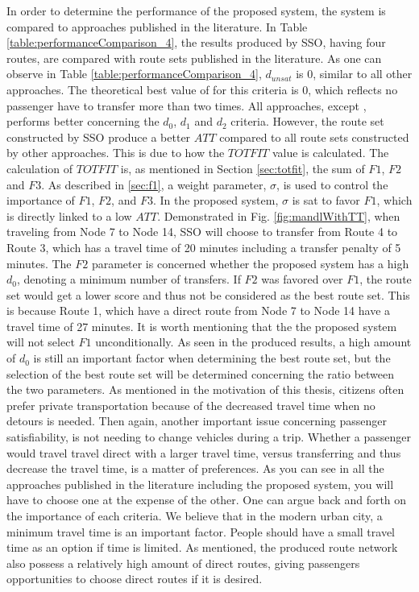 In order to determine the performance of the proposed system, the system is compared to approaches published in the literature. In Table \vref{table:performanceComparison_4}, the results produced by SSO, having four routes, are compared with route sets published in the literature. As one can observe in Table \vref{table:performanceComparison_4},  $d_{unsat}$ is 0, similar to all other approaches. The theoretical best value of for this criteria is 0, which reflects no passenger have to transfer more than two times. All approaches, except \citep{mandl79, kidwai98, chakroborty02}, performs better concerning the $d_0$, $d_1$ and $d_2$ criteria. However, the route set constructed by SSO produce a better $ATT$ compared to all route sets constructed by  other approaches. This is due to how the $TOTFIT$ value is calculated. The calculation of $TOTFIT$ is, as mentioned in Section \vref{sec:totfit}, the sum of $F1$, $F2$ and $F3$. As described in \vref{sec:f1}, a weight parameter, $\sigma$, is used to control the importance of $F1$, $F2$, and $F3$. In the proposed system, $\sigma$ is sat to favor $F1$, which is directly linked to a low $ATT$. Demonstrated in Fig. \vref{fig:mandlWithTT}, when traveling from Node 7 to Node 14, SSO will choose to transfer from Route 4 to Route 3, which has a travel time of 20 minutes including a transfer penalty of 5 minutes. The $F2$ parameter is concerned whether the proposed system has a high $d_0$, denoting a minimum number of transfers. If $F2$ was favored over $F1$, the route set would get a lower score and thus not be considered as the best route set. This is because Route 1, which have a direct route from Node 7 to Node 14 have a travel time of 27 minutes. It is worth mentioning that the the proposed system will not select $F1$ unconditionally. As seen in the produced results, a high amount of $d_0$ is still an important factor when determining the best route set, but the selection of the best route set will be determined concerning the ratio between the two parameters. As mentioned in the motivation of this thesis, citizens often prefer private transportation because of the decreased travel time when no detours is needed. Then again, another important issue concerning passenger satisfiability, is not needing to change vehicles during a trip. Whether a passenger would travel travel direct with a larger travel time, versus transferring and thus decrease the travel time, is a matter of preferences. As you can see in all the approaches published in the literature including the proposed system, you will have to choose one at the expense of the other. One can argue back and forth on the importance of each criteria. We believe that in the modern urban city, a minimum travel time is an important factor. People should have a small travel time as an option if time is limited. As mentioned, the produced route network also possess a relatively high amount of direct routes, giving passengers opportunities to choose direct routes if it is desired. %

